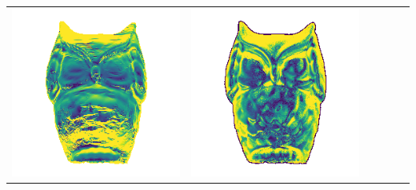 \begin{center}
\begin{tabularx}{\linewidth}{@{}Y@{}Y@{}Y@{}Y@{}Y@{}Y@{}}
\includegraphics[width=\linewidth]{semisynthetic/20150514_15_yu_err.png} &
\includegraphics[width=\linewidth]{semisynthetic/20150514_15_dpsn_err.png} &

\end{tabularx}
\end{center}
